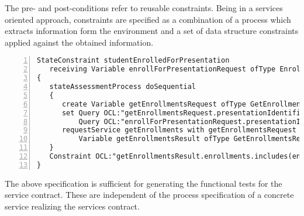 The pre- and post-conditions refer to reusable constraints. Being in a services oriented approach, constraints are specified as a combination of a process which extracts information form the environment and a set of data structure constraints applied against the obtained information.
\tiny \begin{lstlisting}[numbers=left,escapechar=|]
StateConstraint studentEnrolledForPresentation 
   receiving Variable enrollForPresentationRequest ofType EnrollForPresentationRequest
{
   stateAssessmentProcess doSequential
   {
      create Variable getEnrollmentsRequest ofType GetEnrollmentsRequest
      set Query OCL:"getEnrollmentsRequest.presentationIdentifier" equalTo
          Query OCL:"enrollForPresentationRequest.presentationIdentifier"
      requestService getEnrollments with getEnrollmentsRequest yielding
          Variable getEnrollmentsResult ofType GetEnrollmentsResult
   }
   Constraint OCL:"getEnrollmentsResult.enrollments.includes(enrollForPresentationRequest.personIdentifier)"
}
\end{lstlisting}\normalsize
The above specification is sufficient for generating the functional tests for the service contract. These are independent of the process specification of a concrete service realizing the services contract.

